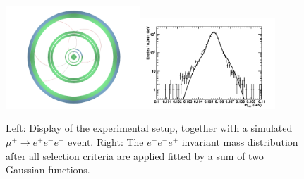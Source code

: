 \begin{figure}[htb]
\begin{center}
\includegraphics[width=0.45\textwidth]{ChargedLeptons/Figures/event.pdf}\includegraphics[width=0.45\textwidth]{ChargedLeptons/Figures/resoFit.pdf}
\end{center}
\caption
{Left: Display of the experimental setup, together with a simulated $\mu^+ \rightarrow e^+e^-e^+$ event. 
Right:  The $e^+e^-e^+$ invariant mass distribution after all selection criteria are applied fitted by a 
sum of two Gaussian functions.}
\label{Fig::mu3e}
\end{figure}




